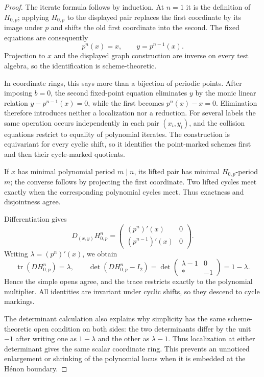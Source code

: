 \documentclass[11pt]{article}
\theoremstyle{definition}
\theoremstyle{remark}
\newcommand{\tr}{\operatorname{tr}}
\begin{document}
\begin{proof}
The iterate formula follows by induction.  At $n=1$ it is the definition of
$H_{0,p}$; applying $H_{0,p}$ to the displayed pair replaces the first
coordinate by its image under $p$ and shifts the old first coordinate into
the second.  The fixed equations are consequently
\[
  p^n(x)=x,
  \qquad
  y=p^{n-1}(x).
\]
Projection to $x$ and the displayed graph construction are inverse on every
test algebra, so the identification is scheme-theoretic.

In coordinate rings, this says more than a bijection of periodic points.
After imposing $b=0$, the second fixed-point equation eliminates $y$ by the
monic linear relation $y-p^{n-1}(x)=0$, while the first becomes
$p^n(x)-x=0$.  Elimination therefore introduces neither a localization nor
a reduction.  For several labels the same operation occurs independently
in each pair $(x_i,y_i)$, and the collision equations restrict to equality
of polynomial iterates.  The construction is equivariant for every cyclic
shift, so it identifies the point-marked schemes first and then their
cycle-marked quotients.

If $x$ has minimal polynomial period $m\mid n$, its lifted pair has minimal
$H_{0,p}$-period $m$; the converse follows by projecting the first
coordinate.  Two lifted cycles meet exactly when the corresponding
polynomial cycles meet.  Thus exactness and disjointness agree.

Differentiation gives
\[
  D_{(x,y)}H_{0,p}^n
  =
  \begin{pmatrix}
    (p^n)'(x)&0\\
    (p^{n-1})'(x)&0
  \end{pmatrix}.
\]
Writing $\lambda=(p^n)'(x)$, we obtain
\[
  \tr(DH_{0,p}^n)=\lambda,
  \qquad
  \det(DH_{0,p}^n-I_2)
  =
  \det
  \begin{pmatrix}
    \lambda-1&0\\
    *&-1
  \end{pmatrix}
  =1-\lambda.
\]
Hence the simple opens agree, and the trace restricts exactly to the
polynomial multiplier.  All identities are invariant under cyclic shifts,
so they descend to cycle markings.

The determinant calculation also explains why simplicity has the same
scheme-theoretic open condition on both sides: the two determinants differ
by the unit $-1$ after writing one as $1-\lambda$ and the other as
$\lambda-1$.  Thus localization at either determinant gives the same scalar
coordinate ring.  This prevents an unnoticed enlargement or shrinking of
the polynomial locus when it is embedded at the Hénon boundary.
\end{proof}
\end{document}
